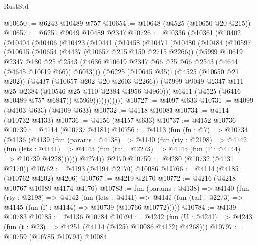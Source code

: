 \begin{lexlean}{RustStd}
\begin{coremodule}
@10650 := @6243 @10489 @757
@10654 := @10648 (@4525 (@10650 @20 @215))
@10657 := @6251 @9049 @10489 @2347
@10726 := @10336
    (@10361
      (@10402
        (@10404
          (@10406
            (@10423
              (@10441
                (@10458
                  (@10471
                    (@10480
                      (@10484
                        (@10597
                          (@10615
                            (@10654
                              (@4437 (@10657 @215 @150 @2715 @2266))
                              (@5999
                                @10619
                                @2347
                                @180
                                @25
                                @2543
                                (@4636
                                  @10619
                                  @2347
                                  @66
                                  @25
                                  @66
                                  @2543
                                  (@4644 (@4645 @10619 @66))
                                  @6033)))
                            (@6225 (@10645 @35))
                            (@4525 (@10650 @21 @202))
                            (@4437 (@10657 @202 @20 @2603 @2266))
                            (@5999 @9049 @2347 @111 @25 @2384 (@10546 @25 @110 @2384 @4956 @4960)))
                          @6411
                          (@4525 (@6416 @10489 @757 @6847))
                          @5969)))))))))))
@10727 := @4097 @633
@10731 := @4099 (@4103 @633) (@4109 @633)
@10732 := @4118 @10083
@10734 := @4114 (@10732 @4133)
@10736 := @4156 (@4157 @633)
@10737 := @4152 @10736
@10739 := @4114 (@10737 @4181)
@10756 := @4113
    (fun (fn : @7) =>
    @10734
      (@4136
        (@4139
          (fun (params : @4138) =>
          @4140
            (fun (rty : @2198) =>
            @4142
              (fun (lets : @4141) =>
              @4143 (fun (tail : @2273) => @4145 (fun (Γ : @4144) => @10739 @4228))))))
        @4274))
    @2170
@10759 := @4280 (@10732 (@4131 @2170))
@10762 := @4193 (@4194 @2170) @10086
@10766 := @4114 (@4185 (@10762 @4202) @4206)
@10767 := @4219 @2170
@10772 := @4216 (@4218 @10767 @10089 @4174 @4176)
@10783 := fun (params : @4138) =>
  @4140
    (fun (rty : @2198) =>
    @4142
      (fun (lets : @4141) =>
      @4143 (fun (tail : @2273) => @4145 (fun (Γ : @4144) => @10739 (@10766 @10772)))))
@10784 := @4139 @10783
@10785 := @4136 @10784
@10794 := @4242
    (fun (U : @4241) => @4243 (fun (t : @23) => @4251 (@4114 (@4257 @10086 @4132) @4268)))
@10797 := @10759 (@10785 @10794) @10084

\end{coremodule}
\end{lexlean}

